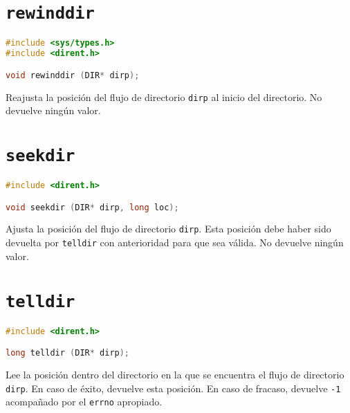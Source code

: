 \section{\texttt{rewinddir}}\label{rewinddir}

\begin{lstlisting}[language=C]
#include <sys/types.h>
#include <dirent.h>

void rewinddir (DIR* dirp);
\end{lstlisting}

Reajusta la posición del flujo de directorio \texttt{dirp} al inicio del directorio.
No devuelve ningún valor.

\pagebreak

\section{\texttt{seekdir}}\label{seekdir}

\begin{lstlisting}[language=C]
#include <dirent.h>

void seekdir (DIR* dirp, long loc);
\end{lstlisting}

Ajusta la posición del flujo de directorio \texttt{dirp}.
Esta posición debe haber sido devuelta por \texttt{telldir} con anterioridad para que sea válida.
No devuelve ningún valor.

\section{\texttt{telldir}}\label{telldir}

\begin{lstlisting}[language=C]
#include <dirent.h>

long telldir (DIR* dirp);
\end{lstlisting}

Lee la posición dentro del directorio en la que se encuentra el flujo de directorio \texttt{dirp}.
En caso de éxito, devuelve esta posición.
En caso de fracaso, devuelve \texttt{-1} acompañado por el \texttt{errno} apropiado.

